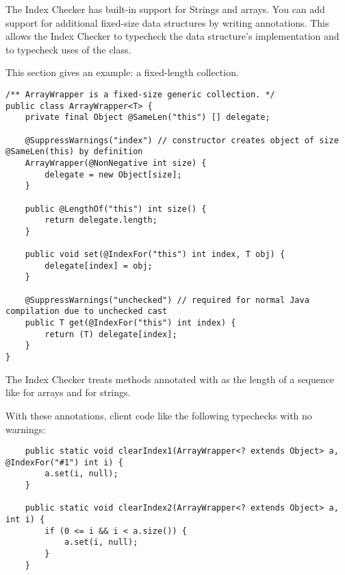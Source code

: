 
The Index Checker has built-in support for Strings and arrays.
You can add support for additional fixed-size data structures by writing
annotations.
This allows the Index Checker to typecheck the data structure's
implementation and to typecheck uses of the class.

This section gives an example:  a fixed-length collection.


\begin{Verbatim}
/** ArrayWrapper is a fixed-size generic collection. */
public class ArrayWrapper<T> {
    private final Object @SameLen("this") [] delegate;

    @SuppressWarnings("index") // constructor creates object of size @SameLen(this) by definition
    ArrayWrapper(@NonNegative int size) {
        delegate = new Object[size];
    }

    public @LengthOf("this") int size() {
        return delegate.length;
    }

    public void set(@IndexFor("this") int index, T obj) {
        delegate[index] = obj;
    }

    @SuppressWarnings("unchecked") // required for normal Java compilation due to unchecked cast
    public T get(@IndexFor("this") int index) {
        return (T) delegate[index];
    }
}
\end{Verbatim}

The Index Checker treats methods annotated with   as
the length of a sequence like  for arrays and
 for strings.

With these annotations, client code like the following typechecks with no
warnings:
\begin{Verbatim}
    public static void clearIndex1(ArrayWrapper<? extends Object> a, @IndexFor("#1") int i) {
        a.set(i, null);
    }

    public static void clearIndex2(ArrayWrapper<? extends Object> a, int i) {
        if (0 <= i && i < a.size()) {
            a.set(i, null);
        }
    }
\end{Verbatim}




